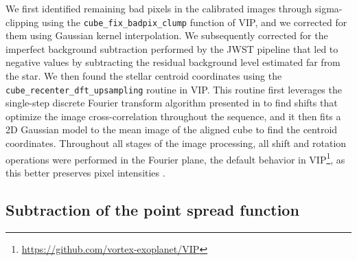 \documentclass[longauth]{aa}
\begin{document}
\begin{appendix}
    We first identified remaining bad pixels in the %
    calibrated images through sigma-clipping using the \texttt{cube\_fix\_badpix\_clump} function of VIP, 
    and we corrected for them using Gaussian kernel interpolation. We subsequently corrected for the imperfect background subtraction performed by the JWST pipeline that led to negative values by subtracting the residual background level estimated far from the star.
    We then found the stellar centroid coordinates using the \texttt{cube\_recenter\_dft\_upsampling} routine in VIP. This routine first leverages the single-step discrete Fourier transform algorithm presented in \citet{Guizar-Sicairos2008} to 
    find
    shifts that optimize the image cross-correlation throughout the sequence, and it then fits
    a 2D Gaussian model to the mean image of the aligned cube to find the centroid coordinates. %
    Throughout all stages of the image processing, all shift and rotation operations were performed in the Fourier plane, the default behavior in VIP\footnote{\url{https://github.com/vortex-exoplanet/VIP}}, as this better preserves pixel intensities \citep[e.g.,][]{Larkin1997}. %
    
\subsection{Subtraction of the point spread function}\label{sec:AltAlgos}
    

\end{appendix}
\end{document}
